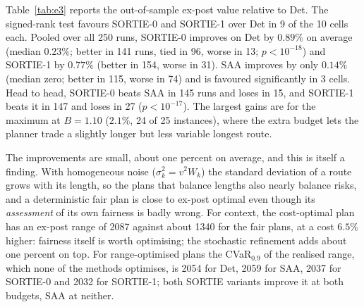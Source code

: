 \documentclass[11pt]{article}
\theoremstyle{definition}
\begin{document}
\begin{table}[t]\centering\small
\caption{E3: what each method believes its unfairness is, relative to the
true ex-post value (Monte Carlo without the day factor, which is what each
model represents), mean signed error over 50 runs per cell. Last column:
largest absolute error of the PBOI prediction for any method's plan.}\label{tab:illusion}

\end{table}

Table~\ref{tab:e3} reports the out-of-sample ex-post value relative to Det.
The signed-rank test favours SORTIE-0 and SORTIE-1 over Det in 9 of the 10
cells each. Pooled over all 250 runs, SORTIE-0 improves on Det by $0.89\%$ on
average (median $0.23\%$; better in 141 runs, tied in 96, worse in 13;
$p<10^{-18}$) and SORTIE-1 by $0.77\%$ (better in 154, worse in 31). SAA
improves by only $0.14\%$ (median zero; better in 115, worse in 74) and is
favoured significantly in 3 cells. Head to head, SORTIE-0 beats SAA in 145
runs and loses in 15, and SORTIE-1 beats it in 147 and loses in 27
($p<10^{-17}$). The largest gains are for the maximum at
$B=1.10$ ($2.1\%$, 24 of 25 instances), where the extra budget lets the
planner trade a slightly longer but less variable longest route.

The improvements are small, about one percent on average, and this is itself
a finding. With homogeneous
noise ($\sigma_k^2=v^2W_k$) the standard deviation of a route grows with its
length, so the plans that balance lengths also nearly balance risks, and a
deterministic fair plan is close to ex-post optimal even though its
\emph{assessment} of its own fairness is badly wrong. For context, the
cost-optimal plan has an ex-post range of 2087 against about 1340 for the fair
plans, at a cost $6.5\%$ higher: fairness itself is worth optimising; the
stochastic refinement adds about one percent on top. For range-optimised plans
the CVaR$_{0.9}$ of the realised range, which none of the methods optimises, is
2054 for Det, 2059 for SAA, 2037 for SORTIE-0 and 2032 for SORTIE-1; both
SORTIE variants improve it at both budgets, SAA at neither.

\begin{table}[t]\centering\small
\caption{E3: improvement of the out-of-sample ex-post value over Det (mean
\%, positive is better; in brackets the number of instances on which the
method is strictly better). $^\ast$: Wilcoxon signed-rank $p<0.05$ in favour
of the method; the test is on ranks and can disagree in sign with the mean
when one instance dominates (Var, $B=1.10$, SORTIE-1).}\label{tab:e3}

\end{table}
\end{document}
